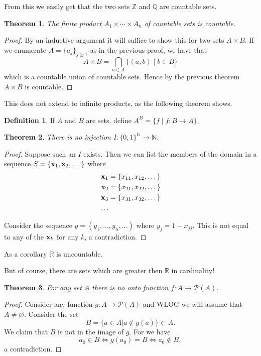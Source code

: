 \documentclass[12pt]{article}
\theoremstyle{plain}
\newtheorem{theorem}{Theorem}
\theoremstyle{definition}
\newtheorem{definition}{Definition}
\begin{document}
From this we easily get that the two sets $\mathbb{Z}$ and $\mathbb{Q}$ are countable sets.

\begin{theorem}
The finite product $A_1 \times \cdots \times A_n$ of countable sets is countable.
\end{theorem}

\begin{proof}
By an inductive argument it will suffice to show this for two sets $A \times B$. If we enumerate $A = \{a_j\}_{j \geq 1}$ as in the previous proof, we have that 
\[A \times B = \bigcap_{a \in A}\{(a, b) \mid b \in B\}\] which is a countable union of countable sets. Hence by the previous theorem $A \times B$ is countable.
\end{proof}

This does not extend to infinite products, as the following theorem shows.
\begin{definition}
If $A$ and $B$ are sets, define $A^B = \{f \mid f:B \to A\}$.
\end{definition}
\begin{theorem}
	There is no injection $I: \{0, 1\}^{\mathbb{N}} \to \mathbb{N}$.
\end{theorem}

\begin{proof}
Suppose such an $I$ exists. Then we can list the members of the domain in a sequence $S = \{\bold{x}_1, \bold{x}_2, \dots\}$ where 
\begin{align*}
\bold{x}_1 &= \{x_{11}, x_{12}, \dots\}\\
\bold{x}_2 &= \{x_{21}, x_{22}, \dots\}\\
\bold{x}_3 &= \{x_{31}, x_{32}, \dots\}\\
	\dots
\end{align*}

Consider the sequence $y = (y_1, \dots, y_n, \dots)$ where $y_j = 1 - x_{jj}$. This is not equal to any of the $\bold{x}_k$ for any $k$, a contradiction.
\end{proof}

As a corollary $\mathbb{R}$ is uncountable.

But of course, there are sets which are greater then $\mathbb{R}$ in cardinality!

\begin{theorem}
For any set $A$ there is no onto function $f:A \to \mathcal{P}(A)$.
\end{theorem}
\begin{proof}
	Consider any function $g: A \to \mathcal{P}(A)$ and WLOG we will assume that $A \neq \varnothing$. Consider the set 
	\[B = \{a \in A | a \not\in g(a)\} \subset A.\]
	We claim that $B$ is not in the image of $g$. For we have
	\[a_0 \in B \iff g(a_0) = B \iff a_0 \not\in B,\]
	a contradiction.
\end{proof}
\end{document}
